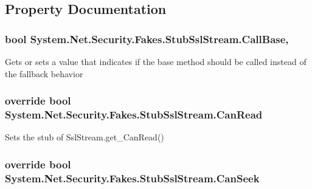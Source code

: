\subsection{Property Documentation}
\hypertarget{class_system_1_1_net_1_1_security_1_1_fakes_1_1_stub_ssl_stream_a9f5e36654fcaf64ad0a851d18d1900a8}{
\subsubsection[{Call\-Base}]{\setlength{\rightskip}{0pt plus 5cm}bool System.\-Net.\-Security.\-Fakes.\-Stub\-Ssl\-Stream.\-Call\-Base\hspace{0.3cm}{\ttfamily [get]}, {\ttfamily [set]}}}\label{class_system_1_1_net_1_1_security_1_1_fakes_1_1_stub_ssl_stream_a9f5e36654fcaf64ad0a851d18d1900a8}


Gets or sets a value that indicates if the base method should be called instead of the fallback behavior

\hypertarget{class_system_1_1_net_1_1_security_1_1_fakes_1_1_stub_ssl_stream_ac5a8490156fb423045cf99e65d364f28}{
\subsubsection[{Can\-Read}]{\setlength{\rightskip}{0pt plus 5cm}override bool System.\-Net.\-Security.\-Fakes.\-Stub\-Ssl\-Stream.\-Can\-Read\hspace{0.3cm}{\ttfamily [get]}}}\label{class_system_1_1_net_1_1_security_1_1_fakes_1_1_stub_ssl_stream_ac5a8490156fb423045cf99e65d364f28}


Sets the stub of Ssl\-Stream.\-get\-\_\-\-Can\-Read()

\hypertarget{class_system_1_1_net_1_1_security_1_1_fakes_1_1_stub_ssl_stream_ad9f694a1a0549b1dd50deeab1f64a329}{
\subsubsection[{Can\-Seek}]{\setlength{\rightskip}{0pt plus 5cm}override bool System.\-Net.\-Security.\-Fakes.\-Stub\-Ssl\-Stream.\-Can\-Seek\hspace{0.3cm}{\ttfamily [get]}}}\label{class_system_1_1_net_1_1_security_1_1_fakes_1_1_stub_ssl_stream_ad9f694a1a0549b1dd50deeab1f64a329}


